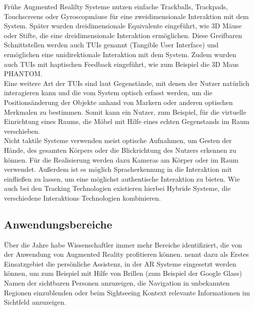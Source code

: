 Frühe Augmented Realilty Systeme nutzen einfache Trackballs, Trackpads, Touchscreens oder Gyroscopmäuse für eine zweidimensionale Interaktion mit dem System. Später wurden dreidimensionale Equivalente eingeführt, wie 3D Mäuse oder Stifte, die eine dreidimensionale Interaktion ermöglichen. Diese Greifbaren Schnittstellen werden auch TUIs genannt (Tangible User Interface) und ermöglichen eine unidirektionale Interaktion mit dem System. Zudem wurden auch TUIs mit haptischen Feedback eingeführt, wie zum Beispiel die 3D Maus PHANTOM. \citep{van2010survey} \\

Eine weitere Art der TUIs sind laut \citet{azuma2001recent} Gegenstände, mit denen der Nutzer natürlich interagieren kann und die vom System optisch erfasst werden, um die Positionsänderung der Objekte anhand von Markern oder anderen optischen Merkmalen zu bestimmen. Somit kann ein Nutzer, zum Beispiel, für die virtuelle Einrichtung eines Raums, die Möbel mit Hilfe eines echten Gegenstands im Raum verschieben. \\

Nicht taktile Systeme verwenden meist optische Aufnahmen, um Gesten der Hände, des gesamten Körpers oder die Blickrichtung des Nutzers erkennen zu können. Für die Realisierung werden dazu Kameras am Körper oder im Raum verwendet. Außerdem ist es möglich Spracherkennung in die Interaktion mit einfließen zu lassen, um eine möglichst authentische Interaktion zu bieten. Wie auch bei den Tracking Technologien existieren hierbei Hybride Systeme, die verschiedene Interaktions Technologien kombinieren. \citep{van2010survey} \\

\subsection{Anwendungsbereiche}

Über die Jahre habe Wissenschaftler immer mehr Bereiche identifiziert, die von der Anwendung von Augmented Reality profitieren können. \citet{van2010survey} nennt dazu als Erstes Einsatzgebiet die persönliche Assistenz, in der AR Systeme eingesetzt werden können, um zum Beispiel mit Hilfe von Brillen (zum Beispiel der Google Glass) Namen der sichtbaren Personen anzuzeigen, die Navigation in unbekannten Regionen einzublenden oder beim Sightseeing Kontext relevante Informationen im Sichtfeld anzuzeigen. \\

